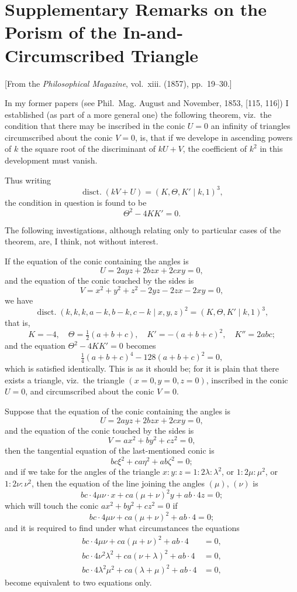 \documentclass[11pt,a4paper]{book}
\begin{document}
\newpage


\section{Supplementary Remarks on the Porism of the In-and-Circumscribed Triangle}
\label{sec:202}

[From the \textit{Philosophical Magazine}, vol.~xiii. (1857), pp.~19--30.]
\vspace{1em}

In my former papers (see Phil.~Mag. August and November, 1853, [115, 116]) I established (as part of a more general one) the following theorem, viz.\ the condition that there may be inscribed in the conic $U=0$ an infinity of triangles circumscribed about the conic $V=0$, is, that if we develope in ascending powers of $k$ the square root of the discriminant of $kU+V$, the coefficient of $k^2$ in this development must vanish.

Thus writing
\[
\operatorname{disct.} (kV+U) = (K, \Theta, K' \mid k, 1)^3,
\]
the condition in question is found to be
\[
\Theta^2 - 4KK' = 0.
\]

The following investigations, although relating only to particular cases of the theorem, are, I think, not without interest.

If the equation of the conic containing the angles is
\[
U = 2ayz + 2bzx + 2cxy = 0,
\]
and the equation of the conic touched by the sides is
\[
V = x^2 + y^2 + z^2 - 2yz - 2zx - 2xy = 0,
\]
we have
\[
\operatorname{disct.} (k,k,k,a-k,b-k,c-k \mid x,y,z)^2 = (K, \Theta, K' \mid k, 1)^3,
\]
that is,
\[
K = -4, \quad \Theta = \tfrac{1}{2}(a+b+c), \quad K' = -(a+b+c)^2, \quad K'' = 2abc;
\]
and the equation $\Theta^2 - 4KK' = 0$ becomes
\[
\tfrac{1}{4}(a+b+c)^4 - 128(a+b+c)^2 = 0,
\]
which is satisfied identically. This is as it should be; for it is plain that there exists a triangle, viz.\ the triangle $(x=0, y=0, z=0)$, inscribed in the conic $U=0$, and circumscribed about the conic $V=0$.

Suppose that the equation of the conic containing the angles is
\[
U = 2ayz + 2bzx + 2cxy = 0,
\]
and the equation of the conic touched by the sides is
\[
V = ax^2 + by^2 + cz^2 = 0,
\]
then the tangential equation of the last-mentioned conic is
\[
bc\xi^2 + ca\eta^2 + ab\zeta^2 = 0;
\]
and if we take for the angles of the triangle $x:y:z = 1:2\lambda:\lambda^2$, or $1:2\mu:\mu^2$, or $1:2\nu:\nu^2$, then the equation of the line joining the angles $(\mu)$, $(\nu)$ is
\[
bc \cdot 4\mu\nu \cdot x + ca(\mu+\nu)^2 y + ab \cdot 4z = 0;
\]
which will touch the conic $ax^2 + by^2 + cz^2 = 0$ if
\[
bc \cdot 4\mu\nu + ca(\mu+\nu)^2 + ab \cdot 4 = 0;
\]
and it is required to find under what circumstances the equations
\begin{align*}
bc \cdot 4\mu\nu + ca(\mu+\nu)^2 + ab \cdot 4 &= 0, \\
bc \cdot 4\nu^2\lambda^2 + ca(\nu+\lambda)^2 + ab \cdot 4 &= 0, \\
bc \cdot 4\lambda^2\mu^2 + ca(\lambda+\mu)^2 + ab \cdot 4 &= 0,
\end{align*}
become equivalent to two equations only.
\end{document}
